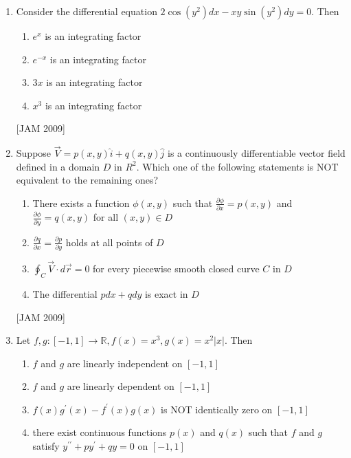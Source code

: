\begin{enumerate}
\begin{enumerate}
\end{enumerate}
\hfill [JAM 2009]

 

\item  Consider the differential equation $2 \cos \left(y^{2}\right) d x-x y \sin \left(y^{2}\right) d y=0$. Then 
\begin{enumerate}
    \item $e^{x}$ is an integrating factor 
\item $e^{-x}$ is an integrating factor 
\item $3 x$ is an integrating factor 
\item $x^{3}$ is an integrating factor
\end{enumerate}
\hfill [JAM 2009]




\item  Suppose $\vec{V}=p(x, y) \hat{i}+q(x, y) \hat{j}$ is a continuously differentiable vector field defined in a domain $D$ in $R^{2}$. Which one of the following statements is NOT equivalent to the remaining ones? 
\begin{enumerate}
    \item There exists a function $\phi(x, y)$ such that $\frac{\partial \phi}{\partial x}=p(x, y)$ and $\frac{\partial \phi}{\partial y}=q(x, y)$ for all $(x, y) \in D$ 
\item $\frac{\partial q}{\partial x}=\frac{\partial p}{\partial y}$ holds at all points of $D$ 
\item $\oint_{C} \vec{V} \cdot d \vec{r}=0$ for every piecewise smooth closed curve $C$ in $D$ 
\item The differential $p d x+q d y$ is exact in $D$
\end{enumerate}
\hfill [JAM 2009]


 \item  Let $f, g:[-1,1] \rightarrow \mathbb{R}, f(x)=x^{3}, g(x)=x^{2}|x|$. Then 
\begin{enumerate}
   
\item $f$ and $g$ are linearly independent on $[-1,1]$ 
\item $f$ and $g$ are linearly dependent on $[-1,1]$ 
\item $f(x) g^{\prime}(x)-f^{\prime}(x) g(x)$ is NOT identically zero on $[-1,1]$ 
\item there exist continuous functions $p(x)$ and $q(x)$ such that $f$ and $g$ satisfy $y^{\prime \prime}+p y^{\prime}+q y=0$ on $[-1,1]$
 

\end{enumerate}
\end{enumerate}
